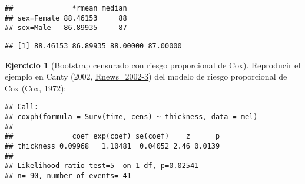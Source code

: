 \documentclass[
]{book}
\newenvironment{Shaded}{\begin{snugshade}}{\end{snugshade}}
\newcommand{\CommentTok}[1]{\textcolor[rgb]{0.56,0.35,0.01}{\textit{#1}}}
\newcommand{\DataTypeTok}[1]{\textcolor[rgb]{0.13,0.29,0.53}{#1}}
\newcommand{\DecValTok}[1]{\textcolor[rgb]{0.00,0.00,0.81}{#1}}
\newcommand{\KeywordTok}[1]{\textcolor[rgb]{0.13,0.29,0.53}{\textbf{#1}}}
\newcommand{\NormalTok}[1]{#1}
\newcommand{\OperatorTok}[1]{\textcolor[rgb]{0.81,0.36,0.00}{\textbf{#1}}}
\newcommand{\StringTok}[1]{\textcolor[rgb]{0.31,0.60,0.02}{#1}}
\theoremstyle{break}
\theoremstyle{definition}
\theoremstyle{definition}
\theoremstyle{definition}
\newtheorem{exercise}{Ejercicio}[chapter]
\theoremstyle{remark}
\begin{document}
\begin{verbatim}
##              *rmean median
## sex=Female 88.46153     88
## sex=Male   86.89935     87
\end{verbatim}

\begin{Shaded}
\end{Shaded}

\begin{verbatim}
## [1] 88.46153 86.89935 88.00000 87.00000
\end{verbatim}

\begin{exercise}[Bootstrap censurado con riesgo proporcional de Cox]
\protect\hypertarget{exr:censboot-cox-ej}{}{\label{exr:censboot-cox-ej} \iffalse (Bootstrap censurado con riesgo proporcional de Cox) \fi{} }
Reproducir el ejemplo en Canty (2002, \href{http://cran.fhcrc.org/doc/Rnews/Rnews_2002-3.pdf}{Rnews\_2002-3}) del modelo de riesgo proporcional de Cox (Cox, 1972):
\end{exercise}

\begin{Shaded}
\end{Shaded}

\begin{verbatim}
## Call:
## coxph(formula = Surv(time, cens) ~ thickness, data = mel)
## 
##              coef exp(coef) se(coef)    z      p
## thickness 0.09968   1.10481  0.04052 2.46 0.0139
## 
## Likelihood ratio test=5  on 1 df, p=0.02541
## n= 90, number of events= 41
\end{verbatim}
\end{document}

